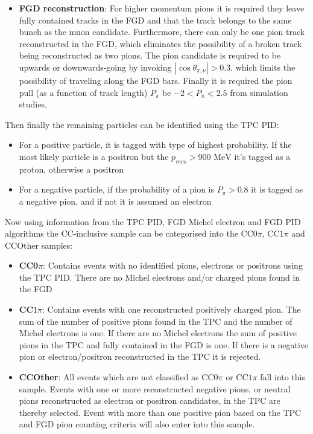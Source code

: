 \begin{itemize}
\begin{itemize}
		\item \textbf{FGD reconstruction}: For higher momentum pions it is required they leave fully contained tracks in the FGD and that the track belongs to the same bunch as the muon candidate. Furthermore, there can only be one pion track reconstructed in the FGD, which eliminates the possibility of a broken track being reconstructed as two pions. The pion candidate is required to be upwards or downwards-going by invoking $|\cos\theta_{\pi,\nu}| > 0.3$, which limits the possibility of traveling along the FGD bars. Finally it is required the pion pull (as a function of track length) $P_\pi$ be $-2 < P_\pi < 2.5$ from simulation studies.
	\end{itemize}
\end{itemize}

Then finally the remaining particles can be identified using the TPC PID: 
\begin{itemize}
	\item For a positive particle, it is tagged with type of highest probability. If the most likely particle is a positron but the $p_{reco} > 900\text{ MeV}$ it's tagged as a proton, otherwise a positron
	
	\item For a negative particle, if the probability of a pion is $P_\pi>0.8$ it is tagged as a negative pion, and if not it is assumed an electron
\end{itemize}

Now using information from the TPC PID, FGD Michel electron and FGD PID algorithms the CC-inclusive sample can be categorised into the CC$0\pi$, CC$1\pi$ and CCOther samples:
\begin{itemize}
	\item \textbf{CC0$\pi$}: Contains events with no identified pions, electrons or positrons using the TPC PID. There are no Michel electrons and/or charged pions found in the FGD
	\item \textbf{CC$1\pi$}: Contains events with one reconstructed positively charged pion. The sum of the number of positive pions found in the TPC and the number of Michel electrons is one. If there are no Michel electrons the sum of positive pions in the TPC and fully contained in the FGD is one. If there is a negative pion or electron/positron reconstructed in the TPC it is rejected.
	\item \textbf{CCOther}: All events which are not classified as CC0$\pi$ or CC$1\pi$ fall into this sample. Events with one or more reconstructed negative pions, or neutral pions reconstructed as electron or positron candidates, in the TPC are thereby selected. Event with more than one positive pion based on the TPC and FGD pion counting criteria will also enter into this sample.
\end{itemize}

